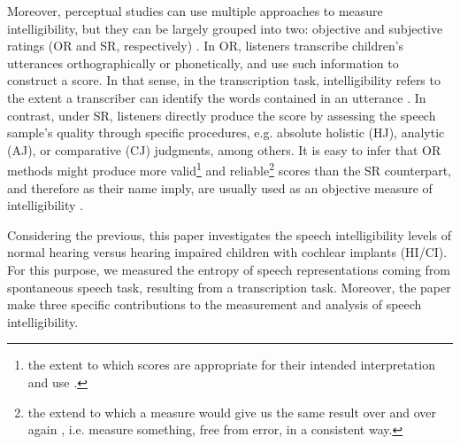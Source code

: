 Moreover, perceptual studies can use multiple approaches to measure intelligibility, but they can be largely grouped into two: objective and subjective ratings (OR and SR, respectively) \citep{Hustad_et_al_2020}. In OR, listeners transcribe children's utterances orthographically or phonetically, and use such information to construct a score. In that sense, in the transcription task, intelligibility refers to the extent a transcriber can identify the words contained in an utterance \cite{Boonen_et_al_2021}. In contrast, under SR, listeners directly produce the score by assessing the speech sample's quality through specific procedures, e.g. absolute holistic (HJ), analytic (AJ), or comparative (CJ) judgments, among others. It is easy to infer that OR methods might produce more valid\footnote{the extent to which scores are appropriate for their intended interpretation and use \citep{Lesterhuis_2018, Trochim_2022}.} and reliable\footnote{the extend to which a measure would give us the same result over and over again \citep{Trochim_2022}, i.e. measure something, free from error, in a consistent way.} scores than the SR counterpart, and therefore as their name imply, are usually used as an objective measure of intelligibility \citep{Boonen_et_al_2021, Faes_et_al_2021}.

Considering the previous, this paper investigates the speech intelligibility levels of normal hearing versus hearing impaired children with cochlear implants (HI/CI). For this purpose, we measured the entropy of speech representations coming from spontaneous speech task, resulting from a transcription task. Moreover, the paper make three specific contributions to the measurement and analysis of speech intelligibility. 

